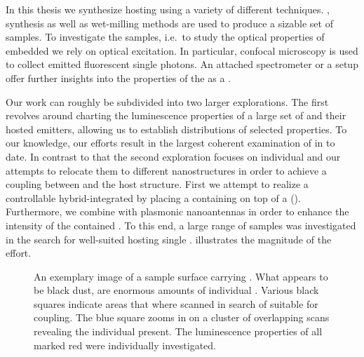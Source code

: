 	In this thesis we synthesize \nds hosting \sivs using a variety of different techniques. \Cvd, \hpht synthesis as well as wet-milling methods are used to produce a sizable set of samples. To investigate the samples, i.e.\ to study the optical properties of embedded \sivs we rely on optical excitation. In particular, confocal microscopy is used to collect emitted fluorescent single photons. An attached spectrometer or a \HBT setup offer further insights into the properties of the \siv as a \sps.

   	Our work can roughly be subdivided into two larger explorations. The first revolves around charting the luminescence properties of a large set of \nds and their hosted emitters, allowing us to establish distributions of selected \siv properties. To our knowledge, our efforts result in the largest coherent examination of \sivs in \nds to date. In contrast to that the second exploration focuses on individual \nds and our attempts to relocate them to different nanostructures in order to achieve a coupling between \sivs and the host structure. First we attempt to realize a controllable hybrid-integrated \sps by placing a \nd containing \sivs on top of a \vcsel (\VCSEL). Furthermore, we combine \nds with plasmonic nanoantennas in order to enhance the \pl intensity of the contained \sivs.
   	To this end, a large range of samples was investigated in the search for well-suited \nds hosting single \sivs.  illustrates the magnitude of the effort.

   	\begin{figure}[!htb]
   		\centering
   		\caption[An enormous amount of \nds visible on a sample]{An exemplary image of a sample surface carrying \nds. What appears to be black dust, are enormous amounts of individual \nds. Various black squares indicate areas that where scanned in search of \nds suitable for coupling. The blue square zooms in on a cluster of overlapping scans revealing the individual \nds present. The luminescence properties of all \nds marked red were individually investigated.}
   		\label{fig::milky_way1}
   	\end{figure}

